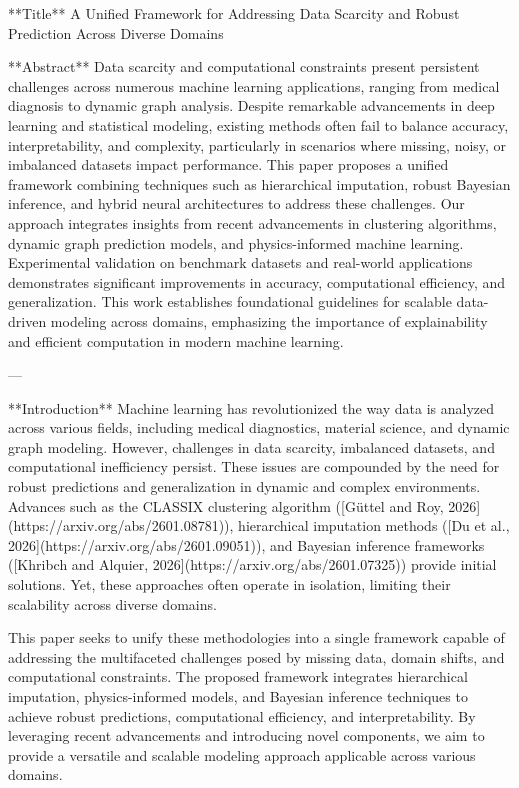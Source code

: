 **Title**  
A Unified Framework for Addressing Data Scarcity and Robust Prediction Across Diverse Domains  

**Abstract**  
Data scarcity and computational constraints present persistent challenges across numerous machine learning applications, ranging from medical diagnosis to dynamic graph analysis. Despite remarkable advancements in deep learning and statistical modeling, existing methods often fail to balance accuracy, interpretability, and complexity, particularly in scenarios where missing, noisy, or imbalanced datasets impact performance. This paper proposes a unified framework combining techniques such as hierarchical imputation, robust Bayesian inference, and hybrid neural architectures to address these challenges. Our approach integrates insights from recent advancements in clustering algorithms, dynamic graph prediction models, and physics-informed machine learning. Experimental validation on benchmark datasets and real-world applications demonstrates significant improvements in accuracy, computational efficiency, and generalization. This work establishes foundational guidelines for scalable data-driven modeling across domains, emphasizing the importance of explainability and efficient computation in modern machine learning.

---

**Introduction**  
Machine learning has revolutionized the way data is analyzed across various fields, including medical diagnostics, material science, and dynamic graph modeling. However, challenges in data scarcity, imbalanced datasets, and computational inefficiency persist. These issues are compounded by the need for robust predictions and generalization in dynamic and complex environments. Advances such as the CLASSIX clustering algorithm ([Güttel and Roy, 2026](https://arxiv.org/abs/2601.08781)), hierarchical imputation methods ([Du et al., 2026](https://arxiv.org/abs/2601.09051)), and Bayesian inference frameworks ([Khribch and Alquier, 2026](https://arxiv.org/abs/2601.07325)) provide initial solutions. Yet, these approaches often operate in isolation, limiting their scalability across diverse domains.

This paper seeks to unify these methodologies into a single framework capable of addressing the multifaceted challenges posed by missing data, domain shifts, and computational constraints. The proposed framework integrates hierarchical imputation, physics-informed models, and Bayesian inference techniques to achieve robust predictions, computational efficiency, and interpretability. By leveraging recent advancements and introducing novel components, we aim to provide a versatile and scalable modeling approach applicable across various domains.

